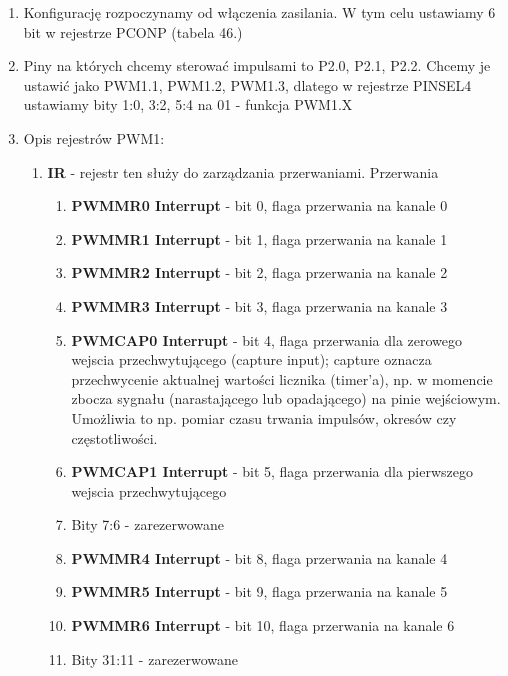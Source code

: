\begin{enumerate}
    \item Konfigurację rozpoczynamy od włączenia zasilania. W tym celu ustawiamy 6 bit w rejestrze PCONP (tabela 46.) %
    \item Piny na których chcemy sterować impulsami to P2.0, P2.1, P2.2. Chcemy je ustawić jako PWM1.1, PWM1.2, PWM1.3, dlatego w rejestrze PINSEL4 ustawiamy bity 1:0, 3:2, 5:4 na 01 - funkcja PWM1.X
    \item Opis rejestrów PWM1:\\
    \begin{enumerate}
        \item \textbf{IR} - rejestr ten służy do zarządzania przerwaniami. Przerwania 
        \begin{enumerate}
            \item \textbf{PWMMR0 Interrupt} - bit 0, flaga przerwania na kanale 0
            \item \textbf{PWMMR1 Interrupt} - bit 1, flaga przerwania na kanale 1
            \item \textbf{PWMMR2 Interrupt} - bit 2, flaga przerwania na kanale 2
            \item \textbf{PWMMR3 Interrupt} - bit 3, flaga przerwania na kanale 3
            \item \textbf{PWMCAP0 Interrupt} - bit 4, flaga przerwania dla zerowego wejscia przechwytującego (capture input); capture oznacza przechwycenie aktualnej wartości licznika (timer'a), np. w momencie zbocza sygnału (narastającego lub opadającego) na pinie wejściowym. Umożliwia to np. pomiar czasu trwania impulsów, okresów czy częstotliwości.
            \item \textbf{PWMCAP1 Interrupt} - bit 5, flaga przerwania dla pierwszego wejscia przechwytującego 
            \item Bity 7:6 - zarezerwowane
            \item \textbf{PWMMR4 Interrupt} - bit 8, flaga przerwania na kanale 4
            \item \textbf{PWMMR5 Interrupt} - bit 9, flaga przerwania na kanale 5
            \item \textbf{PWMMR6 Interrupt} - bit 10, flaga przerwania na kanale 6
            \item Bity 31:11 - zarezerwowane


\end{enumerate}
\end{enumerate}
\end{enumerate}
